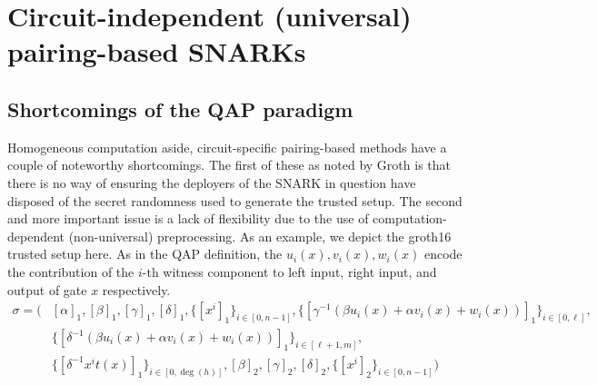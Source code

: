 \section{Circuit-independent (universal) pairing-based SNARKs}
\subsection{Shortcomings of the QAP paradigm}
\noindent Homogeneous computation aside, circuit-specific pairing-based methods have a couple of noteworthy shortcomings. The first of these as noted by Groth \cite{grothupdatable} is that there is no way of ensuring the deployers of the SNARK in question have disposed of the secret randomness used to generate the trusted setup. The second and more important issue is a lack of flexibility due to the use of computation-dependent (non-universal) preprocessing. As an example, we depict the groth16 trusted setup here. As in the QAP definition, the $u_i(x), v_i(x), w_i(x)$ encode the contribution of the $i$-th witness component to left input, right input, and output of gate $x$ respectively. 
\begin{align*}
\sigma = \Big( 
    &[\alpha]_1, [\beta]_1, [\gamma]_1, [\delta]_1, \{[x^i]_1\}_{i \in [0, n-1]}, \{[\gamma^{-1}(\beta u_i(x) + \alpha v_i(x) + w_i(x))]_1\}_{i \in [0, \ell]}, \\
    &\{[\delta^{-1}(\beta u_i(x) + \alpha v_i(x) + w_i(x))]_1\}_{i \in [\ell+1, m]}, \\
    &\{[\delta^{-1} x^i t(x)]_1\}_{i \in [0, \deg(h)]}, [\beta]_2, [\gamma]_2, [\delta]_2, \{[x^i]_2\}_{i \in [0, n-1]}
\Big)
\end{align*}

